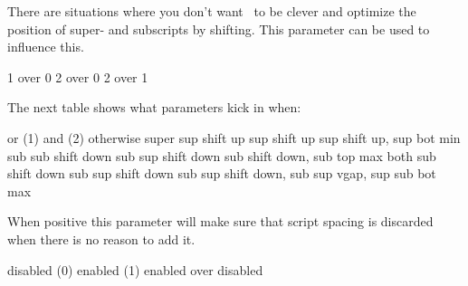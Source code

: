 There are situations where you don't want \TEX\ to be clever and optimize the
position of super- and subscripts by shifting. This parameter can be used to
influence this.

\startlinecorrection
{} {}
  {\startoverlay
     {}
     {}
   \stopoverlay} {}
  {\startoverlay
     {}
     {}
   \stopoverlay} {}
  {\startoverlay
     {}
     {}
   \stopoverlay} {1 over 0}
  {\startoverlay
     {}
     {}
   \stopoverlay} {2 over 0}
  {\startoverlay
     {}
     {}
   \stopoverlay} {2 over 1}
\stopcombination
\stoplinecorrection

The next table shows what parameters kick in when:

\starttabulate[|l|l|l|p|]
\NC       \BC or (1)         \BC and (2)            \BC otherwise       \NC \NR
\BC super \NC sup shift up   \NC sup shift up       \NC sup shift up,
                                                        sup bot min     \NC \NR
\BC sub   \NC sub shift down \NC sub sup shift down \NC sub shift down,
                                                        sub top max     \NC \NR
\BC both  \NC sub shift down \NC sub sup shift down \NC sub sup shift down,
                                                        sub sup vgap,
                                                        sup sub bot max \NC \NR
\stoptabulate

\stopnewprimitive

\startnewprimitive[title={\prm {mathslackmode}}]

When positive this parameter will make sure that script spacing is discarded when
there is no reason to add it.

\startlinecorrection
{}
    {disabled (0)}
    {
     \space
     }
    {enabled (1)}
    {\startoverlay
       {     }
       { \red{}}
     \stopoverlay
     \space
     \startoverlay
       {     }
       { \red{}}
     \stopoverlay}
   {{\red enabled} over disabled}
\stopcombination
\stoplinecorrection

